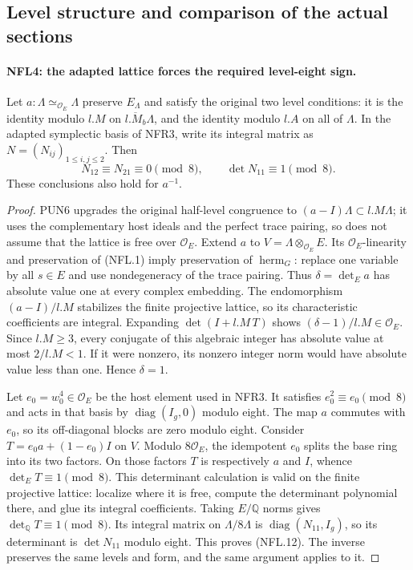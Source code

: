 \subsection{Level structure and comparison of the actual sections}

\paragraph{NFL4: the adapted lattice forces the required level-eight sign.}
\label{claim:NFL4}
Let $a:\Lambda\simeq_{\mathcal O_E}\Lambda$ preserve $E_\Lambda$
and satisfy the original two level conditions: it is the identity
modulo $l.M$ on $\overline{l.M_b}\Lambda$, and the identity modulo
$l.A$ on all of $\Lambda$.  In the adapted symplectic basis of
NFR3, write its integral matrix as
$N=(N_{ij})_{1\le i,j\le2}$.  Then
\[
 N_{12}\equiv N_{21}\equiv0\pmod8,\qquad
 \det N_{11}\equiv1\pmod8.
 \tag{NFL.12}
\]
These conclusions also hold for $a^{-1}$.

\begin{proof}
PUN6 upgrades the original half-level congruence to
$(a-I)\Lambda\subset l.M\Lambda$; it uses the complementary
host ideals and the perfect trace pairing, so does not assume
that the lattice is free over $\mathcal O_E$.
Extend $a$ to $V=\Lambda\otimes_{\mathcal O_E}E$.
Its $\mathcal O_E$-linearity and preservation of (NFL.1) imply
preservation of $\operatorname{herm}_G$: replace one variable
by all $s\in E$ and use nondegeneracy of the trace pairing.
Thus $\delta=\det_Ea$ has absolute value one at every complex
embedding.  The endomorphism $(a-I)/l.M$ stabilizes the finite
projective lattice, so its characteristic coefficients are
integral.  Expanding $\det(I+l.M\,T)$ shows
$(\delta-1)/l.M\in\mathcal O_E$.  Since $l.M\ge3$, every
conjugate of this algebraic integer has absolute value at most
$2/l.M<1$.  If it were nonzero, its nonzero integer norm would
have absolute value less than one.  Hence $\delta=1$.

Let $e_0=w_0^4\in\mathcal O_E$ be the host element used in NFR3.
It satisfies $e_0^2\equiv e_0\pmod8$ and acts in that basis by
$\operatorname{diag}(I_g,0)$ modulo eight.
The map $a$ commutes with $e_0$, so its off-diagonal blocks are
zero modulo eight.  Consider $T=e_0a+(1-e_0)I$ on $V$.
Modulo $8\mathcal O_E$, the idempotent $e_0$ splits the base ring
into its two factors.  On those factors $T$ is respectively
$a$ and $I$, whence $\det_ET\equiv1\pmod8$.
This determinant calculation is valid on the finite projective
lattice: localize where it is free, compute the determinant
polynomial there, and glue its integral coefficients.
Taking $E/\mathbb Q$ norms gives
$\det_{\mathbb Q}T\equiv1\pmod8$.
Its integral matrix on $\Lambda/8\Lambda$ is
$\operatorname{diag}(N_{11},I_g)$, so its determinant is
$\det N_{11}$ modulo eight.  This proves (NFL.12).
The inverse preserves the same levels and form, and the same
argument applies to it.
\end{proof}

